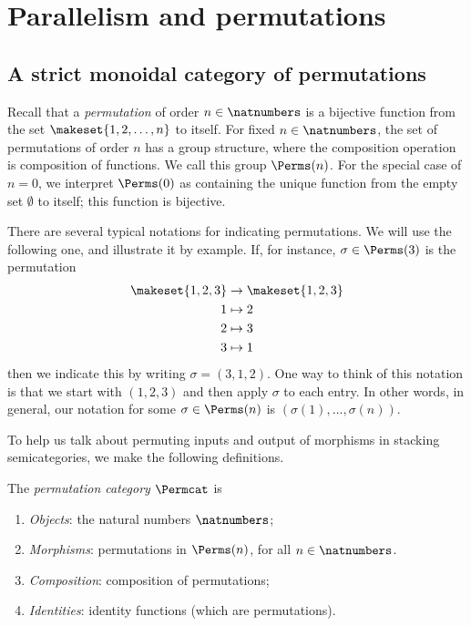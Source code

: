 
\section{Parallelism and permutations}
\label{sec:parallelism-and-permutations}


\subsection{A strict monoidal category of permutations}

Recall that a \emph{permutation} of order $n \in \natnumbers$ is a bijective function from the set $\makeset{1,2, \dots , n}$ to itself.
For fixed $n \in \natnumbers$, the set of permutations of order $n$ has a group structure, where the composition operation is composition of functions.
We call this group $\Perms(n)$.
For the special case of $n = 0$, we interpret $\Perms(0)$ as containing the unique function from the empty set $\emptyset$ to itself; this function is bijective.

There are several typical notations for indicating permutations.
We will use the following one, and illustrate it by example.
If, for instance, $\sigma \in \Perms(3)$ is the permutation
\begin{align*}
    \makeset{1,2,3} & \to \makeset{1,2,3} \\
    1               & \mapsto 2 \\
    2               & \mapsto 3 \\
    3               & \mapsto 1
\end{align*}
then we indicate this by writing $\sigma = (3, 1, 2)$.
One way to think of this notation is that we start with $(1, 2, 3)$ and then apply $\sigma$ to each entry.
In other words, in general, our notation for some $\sigma \in \Perms(n)$ is $(\sigma(1), \dots, \sigma(n))$.

To help us talk about permuting inputs and output of morphisms in stacking semicategories, we make the following definitions.

\begin{definition}
    The \emph{permutation category} $\Permcat$ is
    \begin{enumerate}
        \item \emph{Objects}: the natural numbers $\natnumbers$;
        \item \emph{Morphisms}: permutations in $\Perms(n)$, for all $n \in \natnumbers$.
        \item \emph{Composition}: composition of permutations;
        \item \emph{Identities}: identity functions (which are permutations).
    \end{enumerate}
\end{definition}

